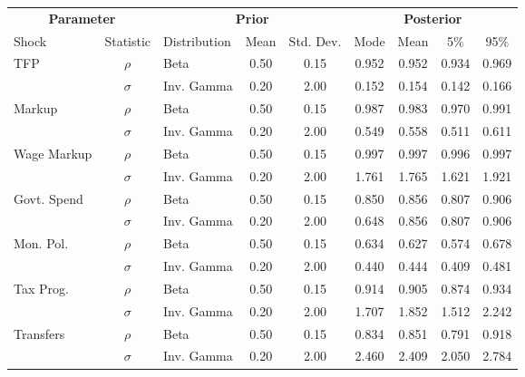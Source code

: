 \begin{tabular}{lclcccccc}
    \toprule
    \multicolumn{2}{c}{\textbf{Parameter}} & \multicolumn{3}{c}{\textbf{Prior}} & \multicolumn{4}{c}{\textbf{Posterior}} \\
    Shock & Statistic & Distribution & Mean & Std. Dev. & Mode & Mean & 5\% & 95\% \\
    \cmidrule(lr){1-2} \cmidrule(lr){3-5} \cmidrule(lr){6-9}
    \multicolumn{1}{l}{\multirow{2}{*}{TFP}} & $\rho$ & Beta & 0.50 & 0.15 & 0.952 & 0.952 & 0.934 & 0.969 \\
    & $\sigma$ & Inv. Gamma & 0.20 & 2.00 & 0.152 & 0.154 & 0.142 & 0.166 \\
    \cmidrule(lr){1-2}
    \multicolumn{1}{l}{\multirow{2}{*}{Markup}} & $\rho$ & Beta & 0.50 & 0.15 & 0.987 & 0.983 & 0.970 & 0.991 \\
    & $\sigma$ & Inv. Gamma & 0.20 & 2.00 & 0.549 & 0.558 & 0.511 & 0.611 \\
    \cmidrule(lr){1-2}
    \multicolumn{1}{l}{\multirow{2}{*}{Wage Markup}} & $\rho$ & Beta & 0.50 & 0.15 & 0.997 & 0.997 & 0.996 & 0.997 \\
    & $\sigma$ & Inv. Gamma & 0.20 & 2.00 & 1.761 & 1.765 & 1.621 & 1.921 \\
    \cmidrule(lr){1-2}
    \multicolumn{1}{l}{\multirow{2}{*}{Govt. Spend}} & $\rho$ & Beta & 0.50 & 0.15 & 0.850 & 0.856 & 0.807 & 0.906 \\
    & $\sigma$ & Inv. Gamma & 0.20 & 2.00 & 0.648 & 0.856 & 0.807 & 0.906 \\
    \cmidrule(lr){1-2}
    \multicolumn{1}{l}{\multirow{2}{*}{Mon. Pol.}} & $\rho$ & Beta & 0.50 & 0.15 & 0.634 & 0.627 & 0.574 & 0.678 \\
    & $\sigma$ & Inv. Gamma & 0.20 & 2.00 & 0.440 & 0.444 & 0.409 & 0.481 \\
    \cmidrule(lr){1-2}
    \multicolumn{1}{l}{\multirow{2}{*}{Tax Prog.}} & $\rho$ & Beta & 0.50 & 0.15 & 0.914 & 0.905 & 0.874 & 0.934 \\
    & $\sigma$ & Inv. Gamma & 0.20 & 2.00 & 1.707 & 1.852 & 1.512 & 2.242 \\
    \cmidrule(lr){1-2}
    \multicolumn{1}{l}{\multirow{2}{*}{Transfers}} & $\rho$ & Beta & 0.50 & 0.15 & 0.834 & 0.851 & 0.791 & 0.918 \\
    & $\sigma$ & Inv. Gamma & 0.20 & 2.00 & 2.460 & 2.409 & 2.050 & 2.784 \\
    \bottomrule
\end{tabular}
